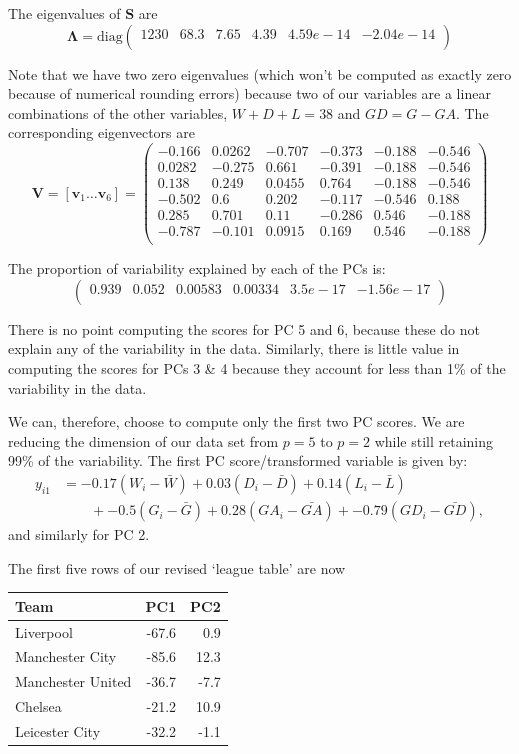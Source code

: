 \documentclass[
]{book}
\theoremstyle{definition}
\theoremstyle{definition}
\theoremstyle{definition}
\theoremstyle{definition}
\theoremstyle{remark}
\begin{document}
The eigenvalues of \(\mathbf S\) are
\[\boldsymbol \Lambda= \text{diag}\begin{pmatrix}1230&68.3&7.65&4.39&4.59e-14&-2.04e-14 \\\end{pmatrix}\]

Note that we have two zero eigenvalues (which won't be computed as exactly zero because of numerical rounding errors) because two of our variables are a linear combinations of the other variables, \(W+D+L = 38\) and \(GD=G-GA\). The corresponding eigenvectors are
\[\mathbf V= [\mathbf v_1 \ldots \mathbf v_6] =\begin{pmatrix}-0.166&0.0262&-0.707&-0.373&-0.188&-0.546 \\0.0282&-0.275&0.661&-0.391&-0.188&-0.546 \\0.138&0.249&0.0455&0.764&-0.188&-0.546 \\-0.502&0.6&0.202&-0.117&-0.546&0.188 \\0.285&0.701&0.11&-0.286&0.546&-0.188 \\-0.787&-0.101&0.0915&0.169&0.546&-0.188 \\\end{pmatrix}\]

The proportion of variability explained by each of the PCs is:
\[
\begin{pmatrix}0.939&0.052&0.00583&0.00334&3.5e-17&-1.56e-17 \\\end{pmatrix}
\]

There is no point computing the scores for PC 5 and 6, because these do not explain any of the variability in the data. Similarly, there is little value in computing the scores for PCs 3 \& 4 because they account for less than 1\% of the variability in the data.

We can, therefore, choose to compute only the first two PC scores. We are reducing the dimension of our data set from \(p=5\) to \(p=2\) while still retaining 99\% of the variability. The first PC score/transformed variable is given by:
\begin{align*}
y_{i1} &= -0.17(W_i-\bar{W}) +0.03(D_i-\bar{D}) +0.14(L_i-\bar{L})\\
& \qquad +-0.5(G_i-\bar{G}) +0.28(GA_i-\bar{GA})+-0.79(GD_i-\bar{GD}),
\end{align*}
and similarly for PC 2.

The first five rows of our revised `league table' are now

\begin{table}
\centering
\begin{tabular}{lrr}
\toprule
Team & PC1 & PC2\\
\midrule
Liverpool & -67.6 & 0.9\\
Manchester City & -85.6 & 12.3\\
Manchester United & -36.7 & -7.7\\
Chelsea & -21.2 & 10.9\\
Leicester City & -32.2 & -1.1\\
\bottomrule
\end{tabular}
\end{table}
\end{document}
